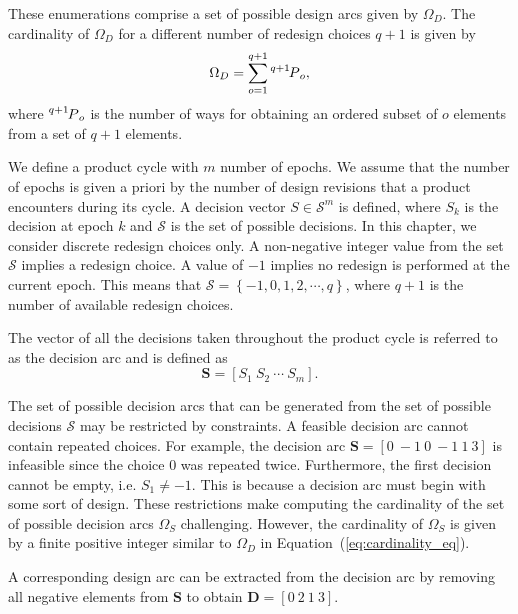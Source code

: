 These enumerations comprise a set of possible design arcs given by $\Omega_D$. The cardinality of $\Omega_D$ for a different number of redesign choices $q+1$ is given by
%
\begin{equation} \label{eq:cardinality_eq}
	\Omega_D = \sum\limits_{o=1}^{q+1}\Myperm[q+1]{o},
\end{equation}
%
where $\Myperm[q+1]{o}$ is the number of ways for obtaining an ordered subset of $o$ elements from a set of $q+1$ elements.

We define a product cycle with $m$ number of epochs. {\color{red} We assume that the number of epochs is given a priori by the number of design revisions that a product encounters during its cycle}. A decision vector $S \in \mathcal{S}^m$ is defined, where $S_k$ is the decision at epoch $k$ and $\mathcal{S}$ is the set of possible decisions. In this chapter, we consider discrete redesign choices only. A non-negative integer value from the set $\mathcal{S}$ implies a redesign choice. A value of $-1$ implies no redesign is performed at the current epoch. This means that $\mathcal{S} = \left\{-1,0,1,2,\cdots,q\right\}$, where $q + 1$ is the number of available redesign choices.

The vector of all the decisions taken throughout the product cycle is referred to as the decision arc and is defined as
%
\begin{equation} \label{eq:decisionarc}
	\mathbf{S} = \left[S_1 ~ S_2 ~ \cdots ~ S_m\right].
\end{equation}

The set of possible decision arcs that can be generated from the set of possible decisions $\mathcal{S}$ may be restricted by constraints. A feasible decision arc cannot contain repeated choices. For example, the decision arc $\mathbf{S} = \left[0 ~ -1 ~ 0 ~ -1 ~ 1 ~ 3\right]$ is infeasible since the choice $0$ was repeated twice. Furthermore, the first decision cannot be empty, i.e. $S_1 \neq -1$. This is because a decision arc must begin with some sort of design. These restrictions make computing the cardinality of the set of possible decision arcs $\Omega_S$ challenging. However, the cardinality of $\Omega_S$ is given by a finite positive integer similar to $\Omega_D$ in Equation~(\ref{eq:cardinality_eq}).

A corresponding design arc can be extracted from the decision arc by removing all negative elements from $\mathbf{S}$ to obtain $\mathbf{D} = \left[0 ~ 2 ~ 1 ~ 3\right]$. 

